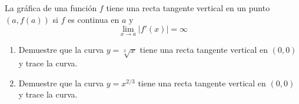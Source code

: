 \item La gráfica de una función $f$ tiene una recta tangente vertical en un punto $(a, f(a))$ si $f$ es continua en $a$ y
    $$\lim_{x \to a} |f'(x)| = \infty$$
    \begin{enumerate}
        \item[(a)] Demuestre que la curva $y = \sqrt[3]{x}$ tiene una recta tangente vertical en $(0, 0)$ y trace la curva.
        \item[(b)] Demuestre que la curva $y = x^{2/3}$ tiene una recta tangente vertical en $(0, 0)$ y trace la curva.
    \end{enumerate}
